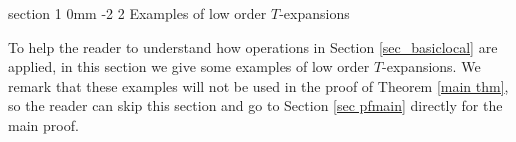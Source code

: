 \documentclass{article}
\makeatletter
\newcommand{\1}{\mathds{1}}
\numberwithin{equation}{section}
\newcommand{\al}{\alpha}
\theoremstyle{plain} %
\theoremstyle{remark}
\renewcommand{\section}{\@startsection
{section}%
{1}%
{0mm}%
{-2\baselineskip}%
{2\baselineskip}%
{\normalfont\large\scshape\centering}} %
\makeatother
\begin{document}
%

\section{Examples of low order $T$-expansions}\label{sec lower_order}

To help the reader to understand how operations in Section \ref{sec_basiclocal} are applied, in this section we give some examples of low order $T$-expansions. We remark that these examples will not be used in the proof of Theorem \ref{main thm}, so the reader can skip this section and go to Section \ref{sec pfmain} directly for the main proof. 
\end{document}
